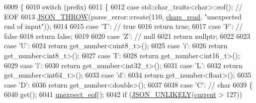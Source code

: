 \begin{DoxyCode}
6009     \{
6010         \textcolor{keywordflow}{switch} (prefix)
6011         \{
6012             \textcolor{keywordflow}{case} std::char\_traits<char>::eof():  \textcolor{comment}{// EOF}
6013                 \hyperlink{json_8hpp_a6c274f6db2e65c1b66c7d41b06ad690f}{JSON\_THROW}(parse\_error::create(110, \hyperlink{classnlohmann_1_1detail_1_1binary__reader_a2dbde0b7390100efe0bfc54e21c3a34b}{chars\_read}, \textcolor{stringliteral}{"unexpected end of
       input"}));
6014 
6015             \textcolor{keywordflow}{case} \textcolor{charliteral}{'T'}:  \textcolor{comment}{// true}
6016                 \textcolor{keywordflow}{return} \textcolor{keyword}{true};
6017             \textcolor{keywordflow}{case} \textcolor{charliteral}{'F'}:  \textcolor{comment}{// false}
6018                 \textcolor{keywordflow}{return} \textcolor{keyword}{false};
6019 
6020             \textcolor{keywordflow}{case} \textcolor{charliteral}{'Z'}:  \textcolor{comment}{// null}
6021                 \textcolor{keywordflow}{return} \textcolor{keyword}{nullptr};
6022 
6023             \textcolor{keywordflow}{case} \textcolor{charliteral}{'U'}:
6024                 \textcolor{keywordflow}{return} get\_number<uint8\_t>();
6025             \textcolor{keywordflow}{case} \textcolor{charliteral}{'i'}:
6026                 \textcolor{keywordflow}{return} get\_number<int8\_t>();
6027             \textcolor{keywordflow}{case} \textcolor{charliteral}{'I'}:
6028                 \textcolor{keywordflow}{return} get\_number<int16\_t>();
6029             \textcolor{keywordflow}{case} \textcolor{charliteral}{'l'}:
6030                 \textcolor{keywordflow}{return} get\_number<int32\_t>();
6031             \textcolor{keywordflow}{case} \textcolor{charliteral}{'L'}:
6032                 \textcolor{keywordflow}{return} get\_number<int64\_t>();
6033             \textcolor{keywordflow}{case} \textcolor{charliteral}{'d'}:
6034                 \textcolor{keywordflow}{return} get\_number<float>();
6035             \textcolor{keywordflow}{case} \textcolor{charliteral}{'D'}:
6036                 \textcolor{keywordflow}{return} get\_number<double>();
6037 
6038             \textcolor{keywordflow}{case} \textcolor{charliteral}{'C'}:  \textcolor{comment}{// char}
6039             \{
6040                 \textcolor{keyword}{get}();
6041                 \hyperlink{classnlohmann_1_1detail_1_1binary__reader_a1dfc55484af3a896c376b41cd99f3e15}{unexpect\_eof}();
6042                 \textcolor{keywordflow}{if} (\hyperlink{json_8hpp_ab77582407c64944e7db1ea95ab520253}{JSON\_UNLIKELY}(\hyperlink{classnlohmann_1_1detail_1_1binary__reader_a7e994e201b215cd6d6ae28a1853f43e0}{current} > 127))

\end{DoxyCode}
